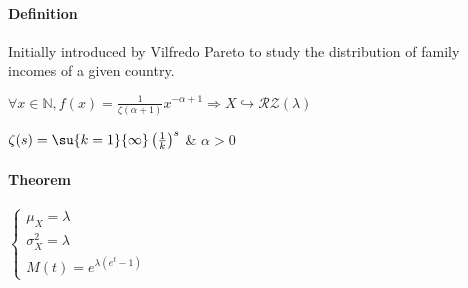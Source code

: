 \paragraph{Definition}
Initially introduced by Vilfredo Pareto to study the distribution of 
family incomes of a given country.
\begin{center}
	$\forall x\in \mathbb{N}, f(x)= \frac{1}{\zeta(\alpha+1)}x^{-\alpha+1}\Rightarrow X\hookrightarrow\mathcal{RZ}(\lambda)$
\end{center}
$\zeta(s)=\su{k=1}{\infty}\left( \frac{1}{k} \right)^{s}$ \& $\alpha > 0$
\paragraph{Theorem}
\begin{center}
$\begin{cases}
	\mu_{X}=\lambda\\
	\sigma_{X}^{2} = \lambda\\
	M(t)=e^{\lambda(e^{t}-1)}
\end{cases}$
\end{center}
